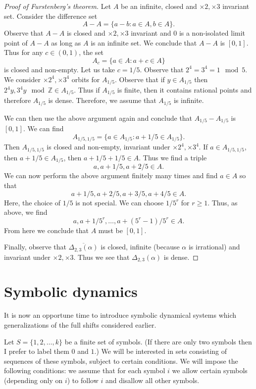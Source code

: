\documentclass[12pt]{article}
\theoremstyle{definition}
\theoremstyle{remark}
\begin{document}
\begin{proof}[Proof of Furstenberg's theorem]
Let $A$ be an infinite, closed and $\times 2,\times 3$ invariant set. Consider the difference set
\[
A-A=\{a-b:a\in A,b\in A\}.
\]
Observe that $A-A$ is closed and $\times 2,\times 3$ invariant and $0$ is a non-isolated limit point of $A-A$ as long as $A$ is an infinite set. We conclude that $A-A$ is $[0,1].$ Thus for any $c\in (0,1)$, the set
\[
A_c=\{a\in A: a+c\in A\}
\]
is closed and non-empty. Let us take $c=1/5$. Observe that $2^4=3^4=1\mod 5$. We consider $\times 2^4, \times 3^4$ orbits for $A_{1/5}.$ Observe that if $y\in A_{1/5}$ then $2^4 y, 3^4 y\mod \mathbb{Z}\in A_{1/5}.$ Thus if $A_{1/5}$ is finite, then it contains rational points and therefore $A_{1/5}$ is dense. Therefore, we assume that $A_{1/5}$ is infinite.

We can then use the above argument again and conclude that $A_{1/5}-A_{1/5}$ is $[0,1].$ We can find
\[
A_{1/5,1/5}=\{a\in A_{1/5}:a+1/5\in A_{1/5}\}.
\]
Then $A_{1/5,1/5}$ is closed and non-empty, invariant under $\times 2^4,\times 3^4.$ If $a\in A_{1/5,1/5}$, then $a+1/5\in A_{1/5}$, then $a+1/5+1/5\in A.$ Thus we find a triple
\[
a,a+1/5,a+2/5\in A.
\]
We can now perform the above argument finitely many times and find $a\in A$ so that
\[
a+1/5,a+2/5,a+3/5,a+4/5\in A.
\]
Here, the choice of $1/5$ is not special. We can choose $1/5^r$ for $r\geq 1.$ Thus, as above, we find
\[
a,a+1/5^r,\dots,a+({5^r}-1)/5^r\in A.
\]
From here we conclude that $A$ must be $[0,1].$

Finally, observe that $\overline{\Delta_{2,3}(\alpha)}$ is closed, infinite (because $\alpha$ is irrational) and invariant under $\times 2, \times 3$. Thus we see that $\Delta_{2,3}(\alpha)$ is dense.
\end{proof}
\section{Symbolic dynamics}

It is now an opportune time to introduce symbolic dynamical systems which generalizations of the full shifts considered earlier.

Let $S = \{1,2,\ldots, k\}$ be a finite set of symbols.  (If there are only two symbols then I prefer to label them $0$ and $1$.)
We will be
interested in sets consisting of sequences of these symbols, subject
to certain conditions.  We will impose the following conditions: we
assume that for each symbol $i$ we allow certain symbols (depending
only on $i$) to follow $i$ and disallow all other symbols.
\end{document}
